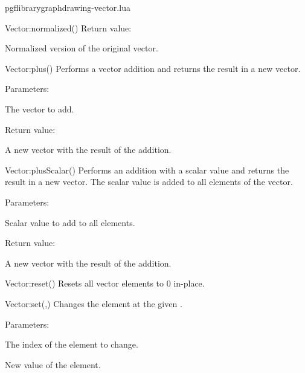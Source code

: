\begin{filedescription}{pgflibrarygraphdrawing-vector.lua}
\begin{luacommand}{{Vector:normalized}()}
Return value:
\begin{parameterdescription} 
  \item[] Normalized version of the original vector. 
\end{parameterdescription}


\end{luacommand}
\begin{luacommand}{{Vector:plus}()}
Performs a vector addition and returns the result in a new vector. 

Parameters:
\begin{parameterdescription}
	\item[\meta{other}] The vector to add. 
\end{parameterdescription}


Return value:
\begin{parameterdescription} 
  \item[] A new vector with the result of the addition. 
\end{parameterdescription}


\end{luacommand}
\begin{luacommand}{{Vector:plusScalar}()}
Performs an addition with a scalar value and returns the result in a new vector.  The scalar value is added to all elements of the vector. 

Parameters:
\begin{parameterdescription}
	\item[\meta{scalar}] Scalar value to add to all elements. 
\end{parameterdescription}


Return value:
\begin{parameterdescription} 
  \item[] A new vector with the result of the addition. 
\end{parameterdescription}


\end{luacommand}
\begin{luacommand}{{Vector:reset}()}
Resets all vector elements to 0 in-place. 



\end{luacommand}
\begin{luacommand}{{Vector:set}(,)}
Changes the element at the given . 

Parameters:
\begin{parameterdescription}
	\item[\meta{index}] The index of the element to change.\item[\meta{value}] New value of the element. 
\end{parameterdescription}




\end{luacommand}
\end{filedescription}
